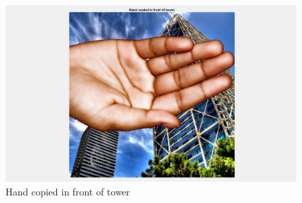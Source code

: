 \documentclass[11pt]{article}
\begin{document}
\begin{figure}[!hbt]
  \includegraphics[width=\textwidth]{task22}
  \caption{Hand copied in front of tower}
  \label{fig:task22}
\end{figure}
\end{document}
